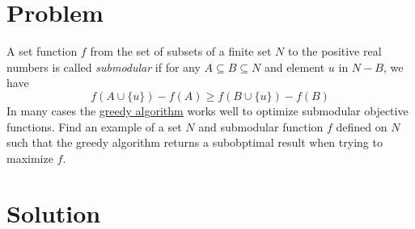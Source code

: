 \documentclass[11pt,a4paper]{report}
\theoremstyle{plain}
\theoremstyle{definition}
\theoremstyle{remark}
\begin{document}
\section*{Problem}
A  set function $f$ from the set of subsets of a finite set $N$ to the positive real numbers is called \emph{submodular} if for any $A\subseteq B \subseteq N$ and element $u$ in $N - B$, we have
$$f(A \cup \{u\}) - f(A)  \geq f(B \cup \{u\}) - f(B)$$
In many cases the \href{https://en.wikipedia.org/wiki/Greedy_algorithm}{greedy algorithm} works well to optimize submodular objective functions.  Find an example of a set $N$ and submodular function $f$ defined on $N$ such that the greedy algorithm returns a subobptimal result when trying to maximize $f$.


\section*{Solution}
\end{document}
